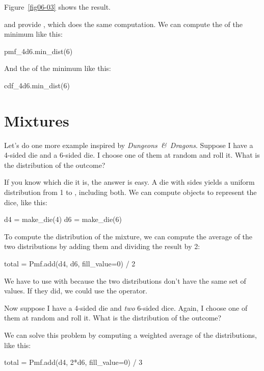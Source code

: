 \documentclass[12pt]{book}
\theoremstyle{exercise}
\begin{document}
Figure~\ref{fig06-03} shows the result.

 and  provide , which does the same computation.
We can compute the  of the minimum like this:

\begin{code}
pmf_4d6.min_dist(6)
\end{code}

And the  of the minimum like this:

\begin{code}
cdf_4d6.min_dist(6)
\end{code}


\section{Mixtures}
\label{mixture}

Let's do one more example inspired by {\it Dungeons~\&~Dragons}.
Suppose I have a 4-sided die and a 6-sided die.
I choose one of them at random and roll it.
What is the distribution of the outcome?

If you know which die it is, the answer is easy.
A die with  sides yields a uniform distribution from 1 to , including both.
We can compute  objects to represent the dice, like this:

\begin{code}
d4 = make_die(4)
d6 = make_die(6)
\end{code}

To compute the distribution of the mixture, we can compute the average of the two distributions by adding them and dividing the result by 2:

\begin{code}
total = Pmf.add(d4, d6, fill_value=0) / 2
\end{code}

We have to use  with  because the two distributions don't have the same set of values.
If they did, we could use the \py{+} operator.

Now suppose I have a 4-sided die and {\it two} 6-sided dice.
Again, I choose one of them at random and roll it.
What is the distribution of the outcome?

We can solve this problem by computing a weighted average of the distributions, like this:

\begin{code}
total = Pmf.add(d4, 2*d6, fill_value=0) / 3
\end{code}
\end{document}
